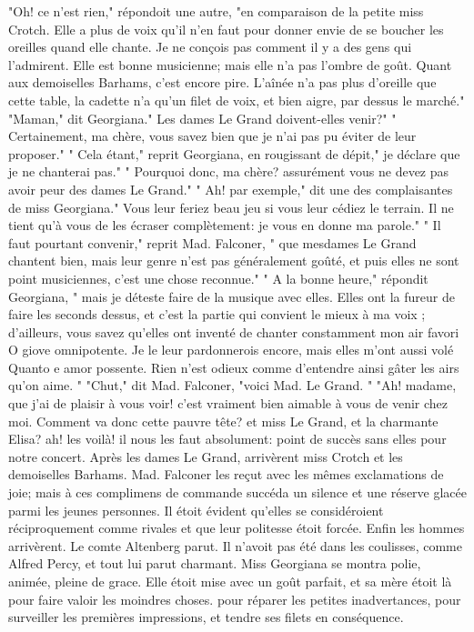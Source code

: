 "Oh! ce n’est rien," répondoit une autre, "en comparaison de la petite miss Crotch. Elle a plus de voix qu’il n’en faut pour donner envie de se boucher les oreilles quand elle chante. Je ne conçois pas comment il y a des gens qui l’admirent. Elle est bonne musicienne; mais elle n’a pas l’ombre de goût. Quant aux demoiselles Barhams, c’est encore pire. L’aînée n’a pas plus d’oreille que cette table, la cadette n’a qu’un filet de voix, et bien aigre, par dessus le marché."\setcounter{page}{114} "Maman," dit Georgiana." Les dames Le Grand doivent-elles venir?" " Certainement, ma chère, vous savez bien que je n'ai pas pu éviter de leur proposer." " Cela étant," reprit Georgiana, en rougissant de dépit," je déclare que je ne chanterai pas." " Pourquoi donc, ma chère? assurément vous ne devez pas avoir peur des dames Le Grand." " Ah! par exemple," dit une des complaisantes de miss Georgiana." Vous leur feriez beau jeu si vous leur cédiez le terrain. Il ne tient qu'à vous de les écraser complètement: je vous en donne ma parole." " Il faut pourtant convenir," reprit Mad. Falconer, " que mesdames Le Grand chantent bien, mais leur genre n'est pas généralement goûté, et puis elles ne sont point musiciennes, c'est une chose reconnue." " A la bonne heure," répondit Georgiana, " mais je déteste faire de la musique avec elles. Elles ont la fureur de faire les seconds dessus, et c'est la partie qui convient le mieux à ma voix ; d'ailleurs, vous savez qu'elles ont inventé de chanter constamment mon air favori O giove omnipotente. Je le leur pardonnerois encore, mais elles m'ont\setcounter{page}{115} aussi volé Quanto e amor possente. Rien n'est odieux comme d'entendre ainsi gâter les airs qu'on aime. "
"Chut," dit Mad. Falconer, "voici Mad. Le Grand. "
"Ah! madame, que j'ai de plaisir à vous voir! c'est vraiment bien aimable à vous de venir chez moi. Comment va donc cette pauvre tête? et miss Le Grand, et la charmante Elisa? ah! les voilà! il nous les faut absolument: point de succès sans elles pour notre concert.
Après les dames Le Grand, arrivèrent miss Crotch et les demoiselles Barhams. Mad. Falconer les reçut avec les mêmes exclamations de joie; mais à ces complimens de commande succéda un silence et une réserve glacée parmi les jeunes personnes. Il étoit évident qu'elles se considéroient réciproquement comme rivales et que leur politesse étoit forcée.
Enfin les hommes arrivèrent. Le comte Altenberg parut. Il n'avoit pas été dans les coulisses, comme Alfred Percy, et tout lui parut charmant. Miss Georgiana se montra polie, animée, pleine de grace. Elle étoit mise avec un goût parfait, et sa mère étoit là pour faire valoir les moindres choses. \setcounter{page}{116} pour réparer les petites inadvertances, pour surveiller les premières impressions, et tendre ses filets en conséquence.
